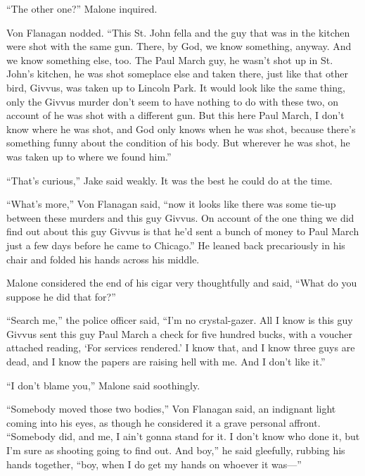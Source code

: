 \documentclass{novel}
\begin{document}
“The other one?” Malone inquired.

Von Flanagan nodded. “This St. John fella and the guy that was in the kitchen were shot with the same gun. There, by God, we know something, anyway. And we know something else, too. The Paul March guy, he wasn’t shot up in St. John’s kitchen, he was shot someplace else and taken there, just like that other bird, Givvus, was taken up to Lincoln Park. It would look like the same thing, only the Givvus murder don’t seem to have nothing to do with these two, on account of he was shot with a different gun. But this here Paul March, I don’t know where he was shot, and God only knows when he was shot, because there’s something funny about the condition of his body. But wherever he was shot, he was taken up to where we found him.”

“That’s curious,” Jake said weakly. It was the best he could do at the time.

“What’s more,” Von Flanagan said, “now it looks like there was some tie-up between these murders and this guy Givvus. On account of the one thing we did find out about this guy Givvus is that he’d sent a bunch of money to Paul March just a few days before he came to Chicago.” He leaned back precariously in his chair and folded his hands across his middle.

Malone considered the end of his cigar very thoughtfully and said, “What do you suppose he did that for?”

“Search me,” the police officer said, “I’m no crystal-gazer. All I know is this guy Givvus sent this guy Paul March a check for five hundred bucks, with a voucher attached reading, ‘For services rendered.’ I know that, and I know three guys are dead, and I know the papers are raising hell with me. And I don’t like it.”

“I don’t blame you,” Malone said soothingly.

“Somebody moved those two bodies,” Von Flanagan said, an indignant light coming into his eyes, as though he considered it a grave personal affront. “Somebody did, and me, I ain’t gonna stand for it. I don’t know who done it, but I’m sure as shooting going to find out. And boy,” he said gleefully, rubbing his hands together, “boy, when I do get my hands on whoever it was—”

\begin{ChapterStart}
\vspace{3\nbs}
\end{ChapterStart}
\end{document}

